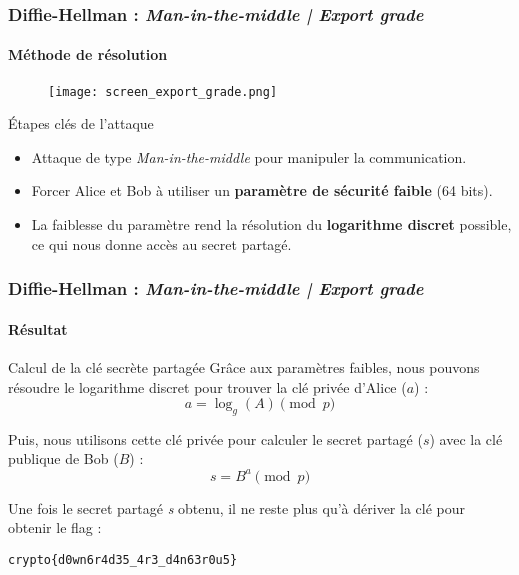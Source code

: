 \begin{frame}
    \frametitle{Diffie-Hellman : \textit{Man-in-the-middle | Export grade}}
    \framesubtitle{Méthode de résolution}

    \begin{figure}
        \centering
        \texttt{[image: screen\_export\_grade.png]}
    \end{figure}

    \begin{block}{Étapes clés de l'attaque}
        \begin{itemize}
            \item Attaque de type \textit{Man-in-the-middle} pour manipuler la communication.
            \item Forcer Alice et Bob à utiliser un \textbf{paramètre de sécurité faible} (64 bits).
            \item La faiblesse du paramètre rend la résolution du \textbf{logarithme discret} possible, ce qui nous donne accès au secret partagé.
        \end{itemize}
    \end{block}
    
\end{frame}


\begin{frame}
    \frametitle{Diffie-Hellman : \textit{Man-in-the-middle | Export grade}}
    \framesubtitle{Résultat}

    \begin{block}{Calcul de la clé secrète partagée}
        Grâce aux paramètres faibles, nous pouvons résoudre le logarithme discret pour trouver la clé privée d'Alice ($a$) :
        $$ a = \log_g(A) \pmod{p} $$
        
        Puis, nous utilisons cette clé privée pour calculer le secret partagé ($s$) avec la clé publique de Bob ($B$) :
        $$ s = B^a \pmod{p} $$
    \end{block}
    
    \vspace{1em}
    
    Une fois le secret partagé \textit{s} obtenu, il ne reste plus qu'à dériver la clé pour obtenir le flag : 

        \begin{center}
            \Large\texttt{crypto\{d0wn6r4d35\_4r3\_d4n63r0u5\}}
        \end{center}

\end{frame}